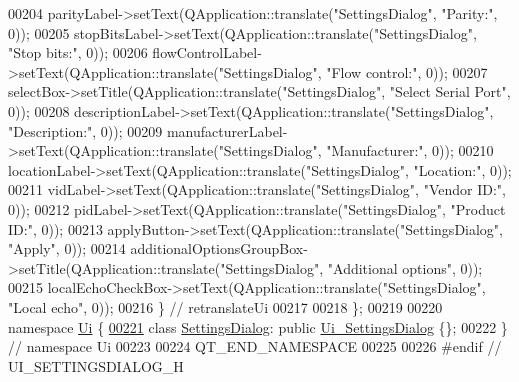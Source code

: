 \begin{DoxyCode}
00204         parityLabel->setText(QApplication::translate(\textcolor{stringliteral}{"SettingsDialog"}, \textcolor{stringliteral}{"Parity:"}, 0));
00205         stopBitsLabel->setText(QApplication::translate(\textcolor{stringliteral}{"SettingsDialog"}, \textcolor{stringliteral}{"Stop bits:"}, 0));
00206         flowControlLabel->setText(QApplication::translate(\textcolor{stringliteral}{"SettingsDialog"}, \textcolor{stringliteral}{"Flow control:"}, 0));
00207         selectBox->setTitle(QApplication::translate(\textcolor{stringliteral}{"SettingsDialog"}, \textcolor{stringliteral}{"Select Serial Port"}, 0));
00208         descriptionLabel->setText(QApplication::translate(\textcolor{stringliteral}{"SettingsDialog"}, \textcolor{stringliteral}{"Description:"}, 0));
00209         manufacturerLabel->setText(QApplication::translate(\textcolor{stringliteral}{"SettingsDialog"}, \textcolor{stringliteral}{"Manufacturer:"}, 0));
00210         locationLabel->setText(QApplication::translate(\textcolor{stringliteral}{"SettingsDialog"}, \textcolor{stringliteral}{"Location:"}, 0));
00211         vidLabel->setText(QApplication::translate(\textcolor{stringliteral}{"SettingsDialog"}, \textcolor{stringliteral}{"Vendor ID:"}, 0));
00212         pidLabel->setText(QApplication::translate(\textcolor{stringliteral}{"SettingsDialog"}, \textcolor{stringliteral}{"Product ID:"}, 0));
00213         applyButton->setText(QApplication::translate(\textcolor{stringliteral}{"SettingsDialog"}, \textcolor{stringliteral}{"Apply"}, 0));
00214         additionalOptionsGroupBox->setTitle(QApplication::translate(\textcolor{stringliteral}{"SettingsDialog"}, \textcolor{stringliteral}{"Additional options"},
       0));
00215         localEchoCheckBox->setText(QApplication::translate(\textcolor{stringliteral}{"SettingsDialog"}, \textcolor{stringliteral}{"Local echo"}, 0));
00216     \} \textcolor{comment}{// retranslateUi}
00217 
00218 \};
00219 
00220 \textcolor{keyword}{namespace }\hyperlink{a00145}{Ui} \{
\hypertarget{a00141_source_l00221}{}\hyperlink{a00076}{00221}     \textcolor{keyword}{class }\hyperlink{a00076}{SettingsDialog}: \textcolor{keyword}{public} \hyperlink{a00082}{Ui\_SettingsDialog} \{\};
00222 \} \textcolor{comment}{// namespace Ui}
00223 
00224 QT\_END\_NAMESPACE
00225 
00226 \textcolor{preprocessor}{#endif // UI\_SETTINGSDIALOG\_H}
\end{DoxyCode}
